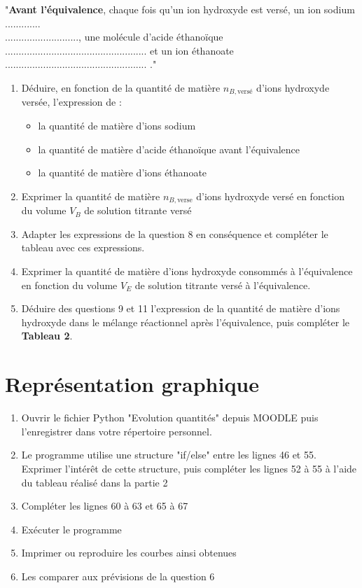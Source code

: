 \documentclass[a4paper,11pt,fleqn]{scrartcl}%
\begin{document}
"\textbf{Avant l'équivalence}, chaque fois qu'un ion hydroxyde  est versé, un ion sodium  .............\\..........................., une molécule d'acide éthanoïque  .................................................... et un ion éthanoate  .................................................... ."
\begin{enumerate}[resume]
	\item Déduire, en fonction de la quantité de matière $n_{B,\text{versé}}$ d'ions hydroxyde versée, l'expression de :
		\begin{itemize}
			\item la quantité de matière d'ions sodium 
			\item la quantité de matière d'acide éthanoïque  avant l'équivalence
			\item la quantité de matière d'ions éthanoate 
		\end{itemize}
		\item Exprimer la quantité de matière $n_{B,\text{verse}}$ d'ions hydroxyde versé en fonction du volume $V_B$ de solution titrante versé
		\item Adapter les expressions de la question 8 en conséquence et compléter le tableau avec ces expressions.
		\item Exprimer la quantité de matière d'ions hydroxyde  consommés à l'équivalence en fonction du volume $V_E$ de solution titrante versé à l'équivalence.
		\item Déduire des questions 9 et 11 l'expression de la quantité de matière d'ions hydroxyde  dans le mélange réactionnel après l'équivalence, puis compléter le \textbf{Tableau 2}.
\end{enumerate}

\section{Représentation graphique}
\begin{enumerate}[resume]
	\item Ouvrir le fichier Python "Evolution quantités" depuis MOODLE puis l'enregistrer dans votre répertoire personnel.
	\item Le programme utilise une structure "if/else" entre les lignes 46 et 55. Exprimer l'intérêt de cette structure, puis compléter les lignes 52 à 55 à l'aide du tableau réalisé dans la partie 2
	\item Compléter les lignes 60 à 63 et 65 à 67
	\item Exécuter le programme
	\item Imprimer ou reproduire les courbes ainsi obtenues
	\item Les comparer aux prévisions de la question 6
\end{enumerate}
\end{document}
